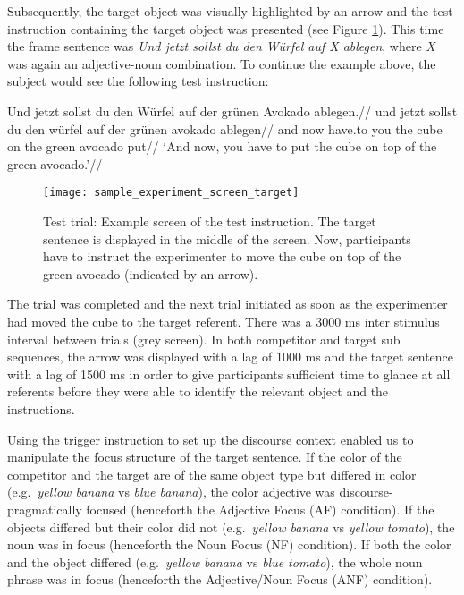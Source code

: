 \documentclass[
]{article}
\begin{document}
Subsequently, the target object was visually highlighted by an arrow and the test instruction containing the target object was presented (see Figure \ref{fig:image2}).
This time the frame sentence was \emph{Und jetzt sollst du den Würfel auf X ablegen}, where \emph{X} was again an adjective-noun combination.
To continue the example above, the subject would see the following test instruction:

\ex \begingl
\glpreamble Und jetzt sollst du den Würfel auf der grünen Avokado ablegen.//
\gla und jetzt sollst du den würfel auf der grünen avokado ablegen//
\glb and now have.to you the cube on the green avocado put//
\glft `And now, you have to put the cube on top of the green avocado.'//
\endgl \xe

\begin{figure}[tbp]

{\centering \texttt{[image: sample\_experiment\_screen\_target]} 

}

\caption{Test trial: Example screen of the test instruction. The target sentence is displayed in the middle of the screen. Now, participants have to instruct the experimenter to move the cube on top of the green avocado (indicated by an arrow).}\label{fig:image2}
\end{figure}

The trial was completed and the next trial initiated as soon as the experimenter had moved the cube to the target referent.
There was a 3000 ms inter stimulus interval between trials (grey screen).
In both competitor and target sub sequences, the arrow was displayed with a lag of 1000 ms and the target sentence with a lag of 1500 ms in order to give participants sufficient time to glance at all referents before they were able to identify the relevant object and the instructions.

Using the trigger instruction to set up the discourse context enabled us to manipulate the focus structure of the target sentence.
If the color of the competitor and the target are of the same object type but differed in color (e.g.~\emph{yellow banana} vs \emph{blue banana}), the color adjective was discourse-pragmatically focused (henceforth the Adjective Focus (AF) condition).
If the objects differed but their color did not (e.g.~\emph{yellow banana} vs \emph{yellow tomato}), the noun was in focus (henceforth the Noun Focus (NF) condition).
If both the color and the object differed (e.g.~\emph{yellow banana} vs \emph{blue tomato}), the whole noun phrase was in focus (henceforth the Adjective/Noun Focus (ANF) condition).
\end{document}
